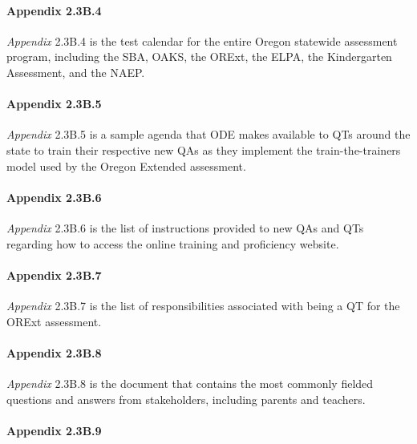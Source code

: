 \documentclass[]{article}
\let\oldparagraph\paragraph
\renewcommand{\paragraph}[1]{\oldparagraph{#1}\mbox{}}
\begin{document}
\hypertarget{appendix-2.3b.4}{%
\paragraph{Appendix 2.3B.4}\label{appendix-2.3b.4}}

\emph{Appendix} 2.3B.4 is the test calendar for the entire Oregon
statewide assessment program, including the SBA, OAKS, the ORExt, the
ELPA, the Kindergarten Assessment, and the NAEP.

\hypertarget{appendix-2.3b.5}{%
\paragraph{Appendix 2.3B.5}\label{appendix-2.3b.5}}

\emph{Appendix} 2.3B.5 is a sample agenda that ODE makes available to
QTs around the state to train their respective new QAs as they implement
the train-the-trainers model used by the Oregon Extended assessment.

\hypertarget{appendix-2.3b.6}{%
\paragraph{Appendix 2.3B.6}\label{appendix-2.3b.6}}

\emph{Appendix} 2.3B.6 is the list of instructions provided to new QAs
and QTs regarding how to access the online training and proficiency
website.

\hypertarget{appendix-2.3b.7}{%
\paragraph{Appendix 2.3B.7}\label{appendix-2.3b.7}}

\emph{Appendix} 2.3B.7 is the list of responsibilities associated with
being a QT for the ORExt assessment.

\hypertarget{appendix-2.3b.8}{%
\paragraph{Appendix 2.3B.8}\label{appendix-2.3b.8}}

\emph{Appendix} 2.3B.8 is the document that contains the most commonly
fielded questions and answers from stakeholders, including parents and
teachers.

\hypertarget{appendix-2.3b.9}{%
\paragraph{Appendix 2.3B.9}\label{appendix-2.3b.9}}
\end{document}
